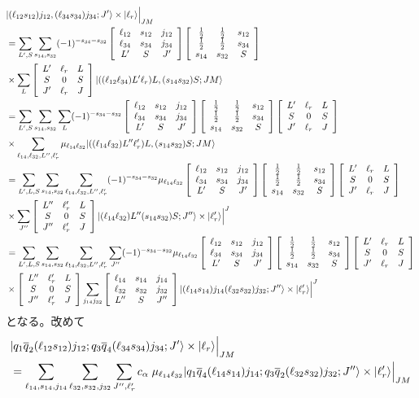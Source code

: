 \documentclass[a4j]{jarticle}
\def\ket{\rangle}
\def\qbar{\overline{{q}}}
\def\half#1{\text{${#1\over 2}$}}
\newcommand{\U}[9]{\left[\begin{array}{ccc}#1&#2&#3\\#4&#5&#6\\#7&#8&#9\\ \end{array}\right]}
\begin{document}
\begin{align}
\lefteqn{|(\ell_{12}s_{12})j_{12},(\ell_{34}s_{34})j_{34};J'\ket \times|\ell_r\ket \Big|_{JM}}&\\
&=
\sum_{L',S}
\sum_{s_{14},s_{32}}
(-1)^{-s_{34}-s_{32}}
\U{\ell_{12}}{s_{12}}{j_{12}}{\ell_{34}}{s_{34}}{j_{34}}{L'}{S}{J'}
\U{\half1}{\half1}{s_{12}}{\half1}{\half1}{s_{34}}{s_{14}}{s_{32}}{S}
\nonumber\\
&\times 
\sum_{L}
\U{L'}{\ell_r}{L}{S}{0}{S}{J'}{\ell_r}{J}
|((\ell_{12}\ell_{34})L'\ell_r)L,(s_{14}s_{32})S;JM\ket
\\
&=
\sum_{L',S}
\sum_{s_{14},s_{32}}
\sum_{L}
(-1)^{-s_{34}-s_{32}}
\U{\ell_{12}}{s_{12}}{j_{12}}{\ell_{34}}{s_{34}}{j_{34}}{L'}{S}{J'}
\U{\half1}{\half1}{s_{12}}{\half1}{\half1}{s_{34}}{s_{14}}{s_{32}}{S}
\U{L'}{\ell_r}{L}{S}{0}{S}{J'}{\ell_r}{J}
\nonumber\\
&\times 
\sum_{\ell_{14},\ell_{32},L'',\ell_r'}
\mu_{\ell_{14}\ell_{32}} |((\ell_{14}\ell_{32})L''\ell_r')L,(s_{14}s_{32})S;JM\ket
\\
&=
\sum_{L',L,S}
\sum_{s_{14},s_{32}}
\sum_{\ell_{14},\ell_{32},L'',\ell_r'}
(-1)^{-s_{34}-s_{32}}
\mu_{\ell_{14}\ell_{32}}
\U{\ell_{12}}{s_{12}}{j_{12}}{\ell_{34}}{s_{34}}{j_{34}}{L'}{S}{J'}
\U{\half1}{\half1}{s_{12}}{\half1}{\half1}{s_{34}}{s_{14}}{s_{32}}{S}
\U{L'}{\ell_r}{L}{S}{0}{S}{J'}{\ell_r}{J}
\nonumber\\
&
\times
\sum_{J''}
\U{L''}{\ell_r'}{L}{S}{0}{S}{J''}{\ell_r'}{J}
|(\ell_{14}\ell_{32})L''(s_{14}s_{32})S;J''\ket\times|\ell_r'\ket\Big|^J
\\
&=
\sum_{L',L,S}
\sum_{s_{14},s_{32}}
\sum_{\ell_{14},\ell_{32},L'',\ell_r'}
\sum_{J''}
(-1)^{-s_{34}-s_{32}}
\mu_{\ell_{14}\ell_{32}}
\U{\ell_{12}}{s_{12}}{j_{12}}{\ell_{34}}{s_{34}}{j_{34}}{L'}{S}{J'}
\U{\half1}{\half1}{s_{12}}{\half1}{\half1}{s_{34}}{s_{14}}{s_{32}}{S}
\U{L'}{\ell_r}{L}{S}{0}{S}{J'}{\ell_r}{J}
\nonumber\\
&\times
\U{L''}{\ell_r'}{L}{S}{0}{S}{J''}{\ell_r'}{J}
\sum_{j_{14}j_{32}}
\U{\ell_{14}}{s_{14}}{j_{14}}{\ell_{32}}{s_{32}}{j_{32}}{L''}{S}{J''}
|(\ell_{14}s_{14})j_{14}(\ell_{32}s_{32})j_{32};J''\ket\times|\ell_r'\ket\Big|^J
\end{align}
となる。改めて
\begin{align}
\lefteqn{|q_1\qbar_2  (\ell_{12}s_{12})j_{12};q_3\qbar_4 (\ell_{34}s_{34})j_{34};J'\ket \times|\ell_r\ket \Big|_{JM}}&\nonumber\\
&=
\sum_{\ell_{14},s_{14},j_{14}}
\sum_{\ell_{32},s_{32},j_{32}}
\sum_{J'',\ell_r'}
c_\alpha\; \mu_{\ell_{14}\ell_{32}}
|q_1\qbar_4 (\ell_{14}s_{14})j_{14};q_3\qbar_2  (\ell_{32}s_{32})j_{32};J''\ket\times|\ell_r'\ket\Big|_{JM}
\end{align}
\end{document}
